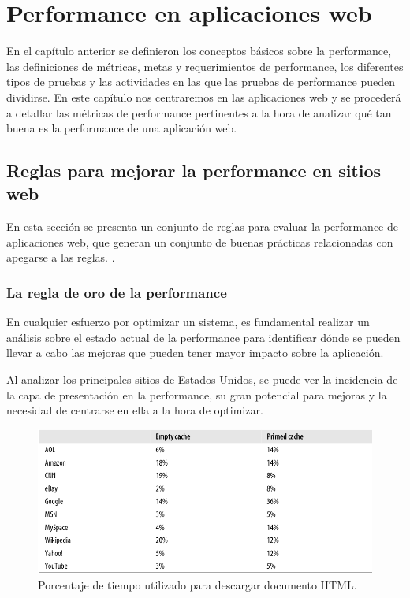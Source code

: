 \chapter{Performance en aplicaciones web}

En el capítulo anterior se definieron los conceptos básicos sobre la performance, las definiciones de métricas, metas y requerimientos de performance, los diferentes tipos
de pruebas y las actividades en las que las pruebas de performance pueden dividirse. En este capítulo nos centraremos en las aplicaciones web y se procederá a
detallar las métricas de performance pertinentes a la hora de analizar qué tan buena es la performance de una aplicación web.



\section{Reglas para mejorar la performance en sitios web}
\label{capitulo3:reglas}

En esta sección se presenta un conjunto de reglas para evaluar la performance de aplicaciones web, que generan un conjunto de buenas prácticas relacionadas con apegarse a las reglas. \cite{souders2007high}.

\subsection{La regla de oro de la performance}

En cualquier esfuerzo por optimizar un sistema, es fundamental realizar un análisis sobre el estado actual de la performance para identificar dónde se pueden llevar a cabo
las mejoras que pueden tener mayor impacto sobre la aplicación.

Al analizar los principales sitios de Estados Unidos, se puede ver la incidencia de la capa de presentación en la performance, su gran potencial para mejoras y la necesidad de centrarse en ella a la hora de optimizar.

\begin{figure}[h!]
\centering
\includegraphics[scale=0.3]{figuras/hpws/tiempos_top10.png}
	\caption{Porcentaje de tiempo utilizado para descargar documento HTML.}
    \label{fig.tiempostopdiez}
\end{figure}

